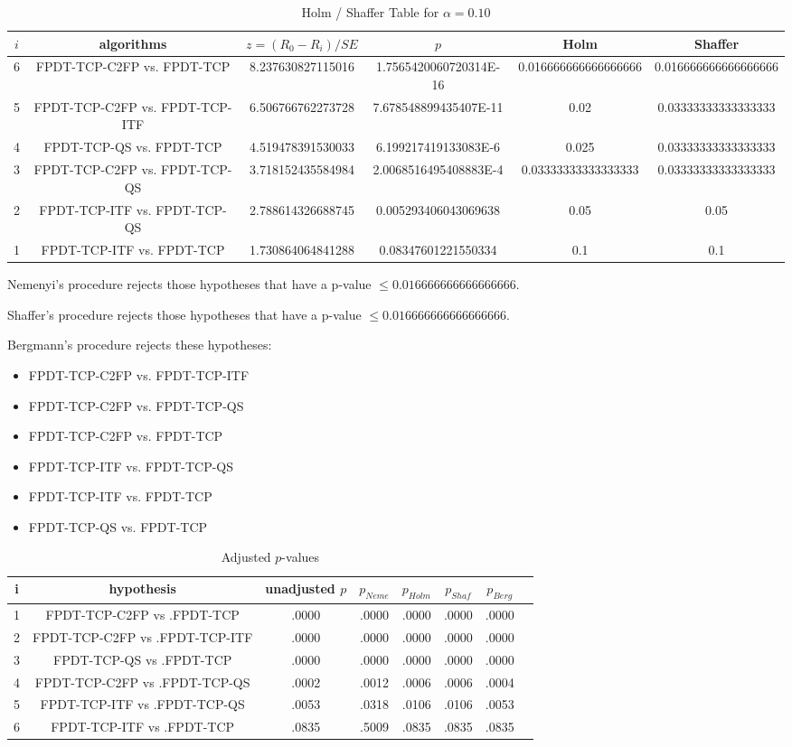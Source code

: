 \documentclass[a4paper,10pt]{article}
\begin{document}
\begin{landscape}
\begin{table}[!htp]
\centering\tiny
\caption{Holm / Shaffer Table for $\alpha=0.10$}
\begin{tabular}{cccccc}
$i$&algorithms&$z=(R_0 - R_i)/SE$&$p$&Holm&Shaffer\\
\hline
6&FPDT-TCP-C2FP vs. FPDT-TCP&8.237630827115016&1.7565420060720314E-16&0.016666666666666666&0.016666666666666666\\5&FPDT-TCP-C2FP vs. FPDT-TCP-ITF&6.506766762273728&7.678548899435407E-11&0.02&0.03333333333333333\\4&FPDT-TCP-QS vs. FPDT-TCP&4.519478391530033&6.199217419133083E-6&0.025&0.03333333333333333\\3&FPDT-TCP-C2FP vs. FPDT-TCP-QS&3.718152435584984&2.0068516495408883E-4&0.03333333333333333&0.03333333333333333\\2&FPDT-TCP-ITF vs. FPDT-TCP-QS&2.788614326688745&0.005293406043069638&0.05&0.05\\1&FPDT-TCP-ITF vs. FPDT-TCP&1.730864064841288&0.08347601221550334&0.1&0.1\\\hline
\end{tabular}
\end{table}
Nemenyi's procedure rejects those hypotheses that have a p-value $\le0.016666666666666666$.


Shaffer's procedure rejects those hypotheses that have a p-value $\le0.016666666666666666$.


Bergmann's procedure rejects these hypotheses:


\begin{itemize}


\item FPDT-TCP-C2FP vs. FPDT-TCP-ITF
\item FPDT-TCP-C2FP vs. FPDT-TCP-QS
\item FPDT-TCP-C2FP vs. FPDT-TCP
\item FPDT-TCP-ITF vs. FPDT-TCP-QS
\item FPDT-TCP-ITF vs. FPDT-TCP
\item FPDT-TCP-QS vs. FPDT-TCP
\end{itemize}


\begin{table}[!htp]
\centering\tiny
\caption{Adjusted $p$-values}
\begin{tabular}{cccccccc}
i&hypothesis&unadjusted $p$&$p_{Neme}$&$p_{Holm}$&$p_{Shaf}$&$p_{Berg}$\\
\hline
1&FPDT-TCP-C2FP vs .FPDT-TCP&.0000&.0000&.0000&.0000&.0000\\2&FPDT-TCP-C2FP vs .FPDT-TCP-ITF&.0000&.0000&.0000&.0000&.0000\\3&FPDT-TCP-QS vs .FPDT-TCP&.0000&.0000&.0000&.0000&.0000\\4&FPDT-TCP-C2FP vs .FPDT-TCP-QS&.0002&.0012&.0006&.0006&.0004\\5&FPDT-TCP-ITF vs .FPDT-TCP-QS&.0053&.0318&.0106&.0106&.0053\\6&FPDT-TCP-ITF vs .FPDT-TCP&.0835&.5009&.0835&.0835&.0835\\\hline
\end{tabular}
\end{table}

\end{landscape}
\end{document}
